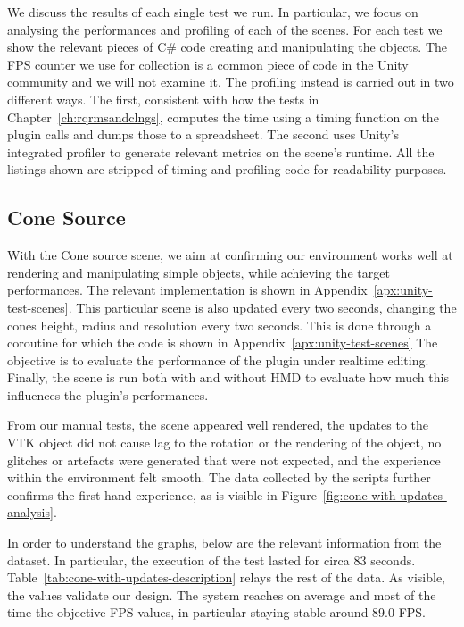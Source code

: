 We discuss the results of each single test we run. In particular, we focus on analysing the performances and profiling of each of the scenes. For each test we show the relevant pieces of C\# code creating and manipulating the objects. The FPS counter we use for collection is a common piece of code in the Unity community and we will not examine it. The profiling instead is carried out in two different ways. The first, consistent with how the tests in Chapter~\ref{ch:rqrmsandclngs}, computes the time using a timing function on the plugin calls and dumps those to a spreadsheet. The second uses Unity's integrated profiler to generate relevant metrics on the scene's runtime. All the listings shown are stripped of timing and profiling code for readability purposes.

\subsection{Cone Source}

With the Cone source scene, we aim at confirming our environment works well at rendering and manipulating simple objects, while achieving the target performances. The relevant implementation is shown in Appendix~\ref{apx:unity-test-scenes}. This particular scene is also updated every two seconds, changing the cones height, radius and resolution every two seconds. This is done through a coroutine for which the code is shown in Appendix~\ref{apx:unity-test-scenes} The objective is to evaluate the performance of the plugin under realtime editing. Finally, the scene is run both with and without HMD to evaluate how much this influences the plugin's performances.

From our manual tests, the scene appeared well rendered, the updates to the VTK object did not cause lag to the rotation or the rendering of the object, no glitches or artefacts were generated that were not expected, and the experience within the environment felt smooth. The data collected by the scripts further confirms the first-hand experience, as is visible in Figure~\ref{fig:cone-with-updates-analysis}.

In order to understand the graphs, below are the relevant information from the dataset. In particular, the execution of the test lasted for circa 83 seconds. Table~\ref{tab:cone-with-updates-description} relays the rest of the data. As visible, the values validate our design. The system reaches on average and most of the time the objective FPS values, in particular staying stable around 89.0 FPS.

